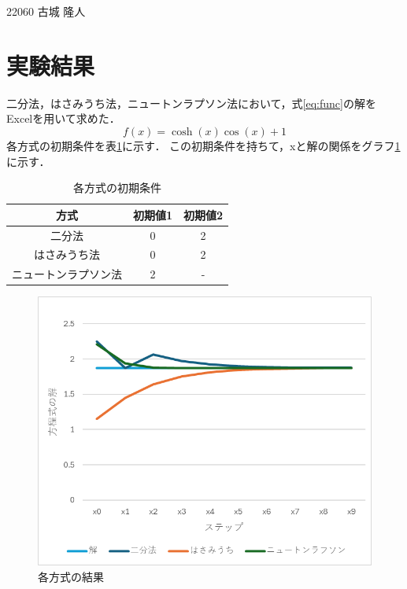\documentclass[a4paper,11pt]{ltjsarticle}
\begin{document}
\begin{flushright}
    22060 古城 隆人\\
\end{flushright}

\section{実験結果}
二分法，はさみうち法，ニュートンラプソン法において，式\eqref{eq:func}の解を
Excelを用いて求めた．
\begin{equation}
    f(x) = \cosh(x)\cos(x) + 1
    \label{eq:func}
\end{equation}
各方式の初期条件を表\ref{tab:init}に示す．
この初期条件を持ちて，xと解の関係をグラフ\ref{fig:result}に示す．
\begin{table}[H]
    \centering
    \caption{各方式の初期条件}
    \begin{tabular}{|c|c|c|}
        \hline
        方式         & 初期値1 & 初期値2 \\ \hline
        二分法        & 0    & 2    \\ \hline
        はさみうち法     & 0    & 2    \\ \hline
        ニュートンラプソン法 & 2    & -    \\ \hline
    \end{tabular}
    \label{tab:init}
\end{table}
\begin{figure}[H]
    \centering
    \includegraphics[width=12cm]{./images/result.png}
    \caption{各方式の結果}
    \label{fig:result}
\end{figure}
\end{document}
